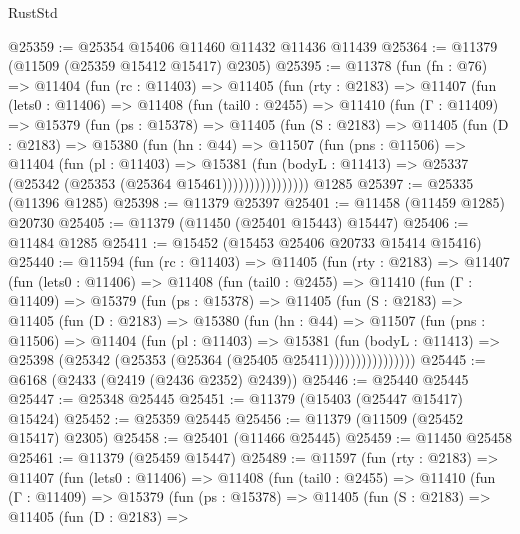 \begin{lexlean}{RustStd}
\begin{coremodule}
@25359 := @25354 @15406 @11460 @11432 @11436 @11439
@25364 := @11379 (@11509 (@25359 @15412 @15417) @2305)
@25395 := @11378
    (fun (fn : @76) =>
    @11404
      (fun (rc : @11403) =>
      @11405
        (fun (rty : @2183) =>
        @11407
          (fun (lets0 : @11406) =>
          @11408
            (fun (tail0 : @2455) =>
            @11410
              (fun (Γ : @11409) =>
              @15379
                (fun (ps : @15378) =>
                @11405
                  (fun (S : @2183) =>
                  @11405
                    (fun (D : @2183) =>
                    @15380
                      (fun (hn : @44) =>
                      @11507
                        (fun (pns : @11506) =>
                        @11404
                          (fun (pl : @11403) =>
                          @15381
                            (fun (bodyL : @11413) =>
                            @25337 (@25342 (@25353 (@25364 @15461))))))))))))))))
    @1285
@25397 := @25335 (@11396 @1285)
@25398 := @11379 @25397
@25401 := @11458 (@11459 @1285) @20730
@25405 := @11379 (@11450 (@25401 @15443) @15447)
@25406 := @11484 @1285
@25411 := @15452 (@15453 @25406 @20733 @15414 @15416)
@25440 := @11594
    (fun (rc : @11403) =>
    @11405
      (fun (rty : @2183) =>
      @11407
        (fun (lets0 : @11406) =>
        @11408
          (fun (tail0 : @2455) =>
          @11410
            (fun (Γ : @11409) =>
            @15379
              (fun (ps : @15378) =>
              @11405
                (fun (S : @2183) =>
                @11405
                  (fun (D : @2183) =>
                  @15380
                    (fun (hn : @44) =>
                    @11507
                      (fun (pns : @11506) =>
                      @11404
                        (fun (pl : @11403) =>
                        @15381
                          (fun (bodyL : @11413) =>
                          @25398 (@25342 (@25353 (@25364 (@25405 @25411))))))))))))))))
@25445 := @6168 (@2433 (@2419 (@2436 @2352) @2439))
@25446 := @25440 @25445
@25447 := @25348 @25445
@25451 := @11379 (@15403 (@25447 @15417) @15424)
@25452 := @25359 @25445
@25456 := @11379 (@11509 (@25452 @15417) @2305)
@25458 := @25401 (@11466 @25445)
@25459 := @11450 @25458
@25461 := @11379 (@25459 @15447)
@25489 := @11597
    (fun (rty : @2183) =>
    @11407
      (fun (lets0 : @11406) =>
      @11408
        (fun (tail0 : @2455) =>
        @11410
          (fun (Γ : @11409) =>
          @15379
            (fun (ps : @15378) =>
            @11405
              (fun (S : @2183) =>
              @11405
                (fun (D : @2183) =>

\end{coremodule}
\end{lexlean}
